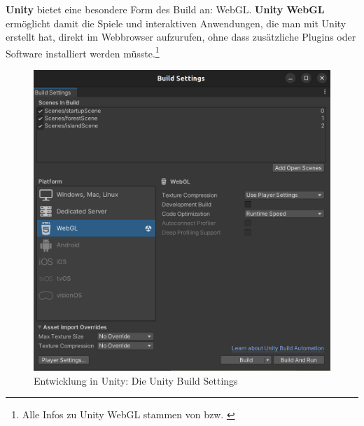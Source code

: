 \textbf{Unity} bietet eine besondere Form des Build an: WebGL. \textbf{Unity WebGL} ermöglicht damit die Spiele und interaktiven Anwendungen, die man mit Unity erstellt hat, direkt im Webbrowser aufzurufen, ohne dass zusätzliche Plugins oder Software installiert werden müsste.\footnote{Alle Infos zu Unity WebGL stammen von \cite{UnityDocsWebGL} bzw. \cite{WebGL}}


\begin{figure}
    \centering
    \includegraphics[scale=0.12]{pics/unity-bulid-settings.png}
    \caption{Entwicklung in Unity: Die Unity Build Settings}
    \label{fig:unity-build-settings}

    \vspace{1cm}


\end{figure}

